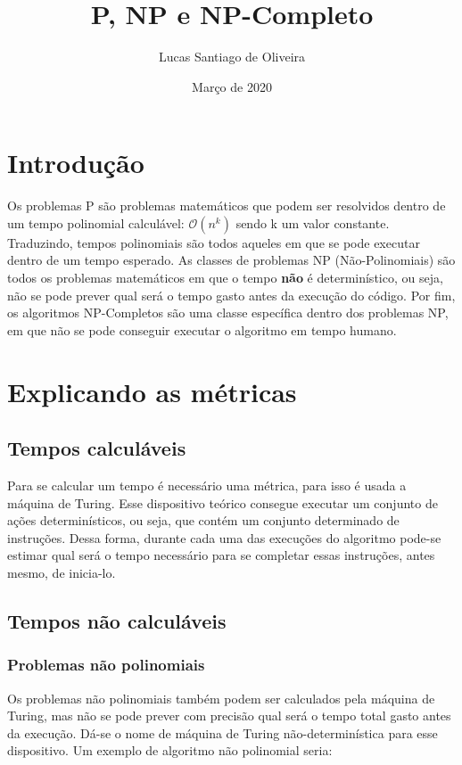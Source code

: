 \documentclass{article}
\title{P, NP e NP-Completo}
\author{Lucas Santiago de Oliveira}
\date{Março de 2020}
\begin{document}
\maketitle

\section{Introdução}

\hspace{4mm} Os problemas P são problemas matemáticos que podem ser resolvidos dentro de um tempo polinomial calculável: $\mathcal{O}(n^k)$ sendo k um valor constante. Traduzindo, tempos polinomiais são todos aqueles em que se pode executar dentro de um tempo esperado. As classes de problemas NP (Não-Polinomiais) são todos os problemas matemáticos em que o tempo \textbf{não} é determinístico, ou seja, não se pode prever qual será o tempo gasto antes da execução do código. Por fim, os algoritmos NP-Completos são uma classe específica dentro dos problemas NP, em que não se pode conseguir executar o algoritmo em tempo humano.


\section{Explicando as métricas}
\subsection{Tempos calculáveis}
\hspace{4mm} Para se calcular um tempo é necessário uma métrica, para isso é usada a máquina de Turing. Esse dispositivo teórico consegue executar um conjunto de ações determinísticos, ou seja, que contém um conjunto determinado de instruções. Dessa forma, durante cada uma das execuções do algoritmo pode-se estimar qual será o tempo necessário para se completar essas instruções, antes mesmo, de inicia-lo.

\subsection{Tempos não calculáveis}
\subsubsection{Problemas não polinomiais}
\hspace{4mm} Os problemas não polinomiais também podem ser calculados pela máquina de Turing, mas não se pode prever com precisão qual será o tempo total gasto antes da execução. Dá-se o nome de máquina de Turing não-determinística para esse dispositivo. Um exemplo de algoritmo não polinomial seria: \newpage

\end{document}
